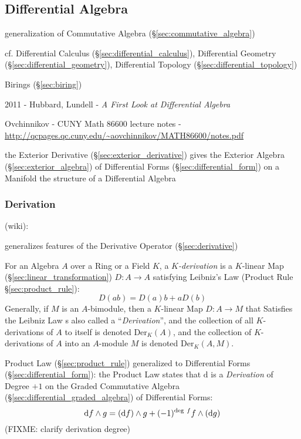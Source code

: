 \subsection{Differential Algebra}\label{sec:differential_algebra}

generalization of Commutative Algebra (\S\ref{sec:commutative_algebra})

cf. Differential Calculus (\S\ref{sec:differential_calculus}), Differential
Geometry (\S\ref{sec:differential_geometry}), Differential Topology
(\S\ref{sec:differential_topology})

Birings (\S\ref{sec:biring})

2011 - Hubbard, Lundell - \emph{A First Look at Differential Algebra}

Ovchinnikov - CUNY Math 86600 lecture notes -
\url{http://qcpages.qc.cuny.edu/~aovchinnikov/MATH86600/notes.pdf}

the Exterior Derivative (\S\ref{sec:exterior_derivative}) gives the Exterior
Algebra (\S\ref{sec:exterior_algebra}) of Differential Forms
(\S\ref{sec:differential_form}) on a Manifold the structure of a Differential
Algebra



\subsubsection{Derivation}\label{sec:derivation}

(wiki):

generalizes features of the Derivative Operator (\S\ref{sec:derivative})

For an Algebra $A$ over a Ring or a Field $K$, a \emph{$K$-derivation} is a
$K$-linear Map (\S\ref{sec:linear_transformation}) $D : A \rightarrow A$
satisfying Leibniz's Law (Product Rule \S\ref{sec:product_rule}):
\[
  D(ab) = D(a)b + aD(b)
\]
Generally, if $M$ is an $A$-bimodule, then a $K$-linear Map $D : A \rightarrow
M$ that Satisfies the Leibniz Law s also called a ``\emph{Derivation}'', and the
collection of all $K$-derivations of $A$ to itself is denoted
$\mathrm{Der}_K(A)$, and the collection of $K$-derivations of $A$ into an
$A$-module $M$ is denoted $\mathrm{Der}_K(A, M)$.

Product Law (\S\ref{sec:product_rule}) generalized to Differential Forms
(\S\ref{sec:differential_form}): the Product Law states that $\mathrm{d}$ is a
\emph{Derivation} of Degree $+1$ on the Graded Commutative Algebra
(\S\ref{sec:differential_graded_algebra}) of Differential Forms:
\[
\mathrm{d}f \wedge g = (\mathrm{d}f) \wedge g +
  (-1)^{\mathrm{deg}\ f}f \wedge (\mathrm{d}g)
\]
(FIXME: clarify derivation degree)

